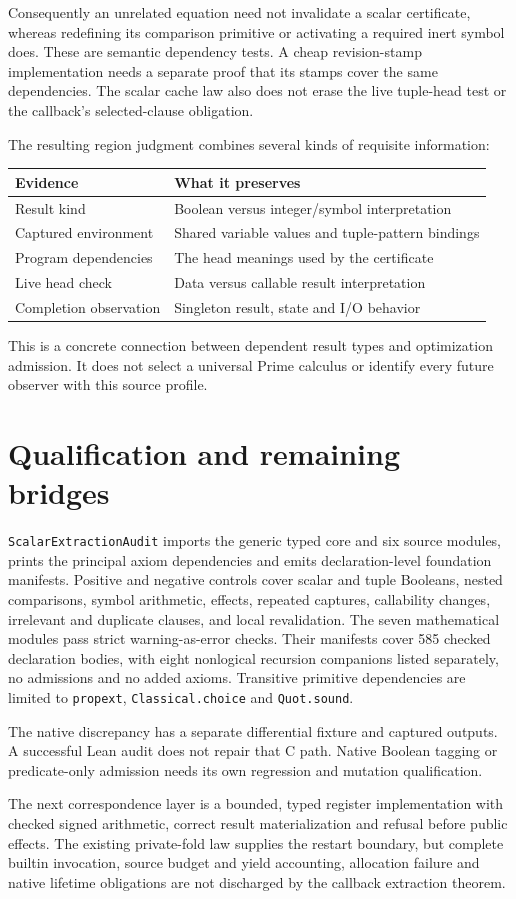 \documentclass[11pt,a4paper]{article}
\newcommand{\code}[1]{\nolinkurl{#1}}
\begin{document}
Consequently an unrelated equation need not invalidate a scalar certificate,
whereas redefining its comparison primitive or activating a required inert
symbol does. These are semantic dependency tests. A cheap revision-stamp
implementation needs a separate proof that its stamps cover the same
dependencies. The scalar cache law also does not erase the live tuple-head
test or the callback's selected-clause obligation.

The resulting region judgment combines several kinds of requisite information:
\begin{center}
\begin{tabularx}{\linewidth}{@{}lX@{}}
\toprule
Evidence & What it preserves\\
\midrule
Result kind & Boolean versus integer/symbol interpretation\\
Captured environment & Shared variable values and tuple-pattern bindings\\
Program dependencies & The head meanings used by the certificate\\
Live head check & Data versus callable result interpretation\\
Completion observation & Singleton result, state and I/O behavior\\
\bottomrule
\end{tabularx}
\end{center}
This is a concrete connection between dependent result types and optimization
admission. It does not select a universal Prime calculus or identify every
future observer with this source profile.

\section{Qualification and remaining bridges}

\code{ScalarExtractionAudit} imports the generic typed core and six source
modules, prints the principal axiom dependencies and emits declaration-level
foundation manifests. Positive and negative controls cover scalar and tuple
Booleans, nested comparisons, symbol arithmetic, effects, repeated captures,
callability changes, irrelevant and duplicate clauses, and local revalidation.
The seven mathematical modules pass strict warning-as-error checks. Their
manifests cover 585 checked declaration bodies, with eight nonlogical
recursion companions listed separately, no admissions and no added axioms.
Transitive primitive dependencies are limited to \code{propext},
\code{Classical.choice} and \code{Quot.sound}.

The native discrepancy has a separate differential fixture and captured
outputs. A successful Lean audit does not repair that C path. Native Boolean
tagging or predicate-only admission needs its own regression and mutation
qualification.

The next correspondence layer is a bounded, typed register implementation
with checked signed arithmetic, correct result materialization and refusal
before public effects. The existing private-fold law supplies the restart
boundary, but complete builtin invocation, source budget and yield accounting,
allocation failure and native lifetime obligations are not discharged by
the callback extraction theorem.
\end{document}

